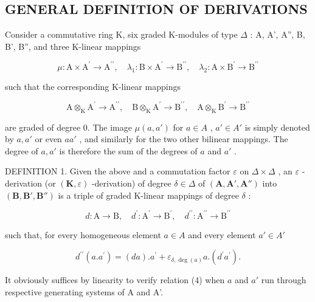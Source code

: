 \subsection{GENERAL DEFINITION OF DERIVATIONS}

Consider a commutative ring K, six graded K-modules of type \(\Delta\) : A, A', A'', B, B', B'', and three K-linear mappings

\[
\mu \colon \mathrm{A} \times \mathrm{A} ^ {\prime} \rightarrow \mathrm{A} ^ {\prime \prime}, \quad \lambda_ {1} \colon \mathrm{B} \times \mathrm{A} ^ {\prime} \rightarrow \mathrm{B} ^ {\prime \prime}, \quad \lambda_ {2} \colon \mathrm{A} \times \mathrm{B} ^ {\prime} \rightarrow \mathrm{B} ^ {\prime \prime}
\]

such that the corresponding K-linear mappings

\[
\mathrm{A} \otimes_ {\mathrm{K}} \mathrm{A} ^ {\prime} \rightarrow \mathrm{A} ^ {\prime \prime}, \quad \mathrm{B} \otimes_ {\mathrm{K}} \mathrm{A} ^ {\prime} \rightarrow \mathrm{B} ^ {\prime \prime}, \quad \mathrm{A} \otimes_ {\mathrm{K}} \mathrm{B} ^ {\prime} \rightarrow \mathrm{B} ^ {\prime \prime}
\]

are graded of degree 0. The image \(\mu(a, a')\) for \(a \in A\) , \(a' \in A'\) is simply denoted by \(a, a'\) or even \(aa'\) , and similarly for the two other bilinear mappings. The degree of \(a, a'\) is therefore the sum of the degrees of \(a\) and \(a'\) .

DEFINITION 1. Given the above and a commutation factor \(\varepsilon\) on \(\Delta \times \Delta\) , an \(\varepsilon\) -derivation (or \((\mathbf{K}, \varepsilon)\) -derivation) of degree \(\delta \in \Delta\) of \((\mathbf{A}, \mathbf{A}', \mathbf{A}'')\) into \((\mathbf{B}, \mathbf{B}', \mathbf{B}'')\) is a triple of graded K-linear mappings of degree \(\delta\) :

\[
d \colon \mathrm{A} \rightarrow \mathrm{B}, \quad d ^ {\prime} \colon \mathrm{A} ^ {\prime} \rightarrow \mathrm{B} ^ {\prime}, \quad d ^ {\prime \prime} \colon \mathrm{A} ^ {\prime \prime} \rightarrow \mathrm{B} ^ {\prime \prime}
\]

such that, for every homogeneous element \(a \in A\) and every element \(a' \in A'\)

\[
d ^ {\prime \prime} (a. a ^ {\prime}) = (d a). a ^ {\prime} + \varepsilon_ {\delta , \deg (a)} a. (d ^ {\prime} a ^ {\prime}).\tag{4}
\]

It obviously suffices by linearity to verify relation (4) when \(a\) and \(a'\) run through respective generating systems of A and A'.

